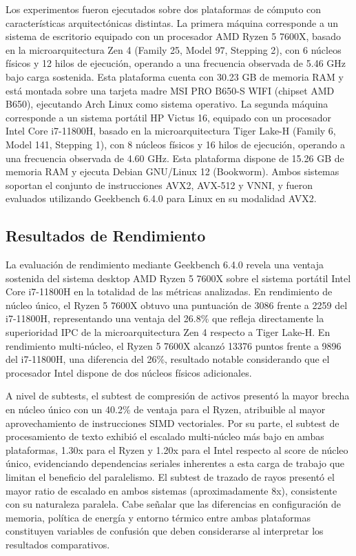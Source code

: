 Los experimentos fueron ejecutados sobre dos plataformas de cómputo con características arquitectónicas distintas. La primera máquina corresponde a un sistema de escritorio equipado con un procesador AMD Ryzen 5 7600X, basado en la microarquitectura Zen 4 (Family 25, Model 97, Stepping 2), con 6 núcleos físicos y 12 hilos de ejecución, operando a una frecuencia observada de 5.46 GHz bajo carga sostenida. Esta plataforma cuenta con 30.23 GB de memoria RAM y está montada sobre una tarjeta madre MSI PRO B650-S WIFI (chipset AMD B650), ejecutando Arch Linux como sistema operativo. La segunda máquina corresponde a un sistema portátil HP Victus 16, equipado con un procesador Intel Core i7-11800H, basado en la microarquitectura Tiger Lake-H (Family 6, Model 141, Stepping 1), con 8 núcleos físicos y 16 hilos de ejecución, operando a una frecuencia observada de 4.60 GHz. Esta plataforma dispone de 15.26 GB de memoria RAM y ejecuta Debian GNU/Linux 12 (Bookworm). Ambos sistemas soportan el conjunto de instrucciones AVX2, AVX-512 y VNNI, y fueron evaluados utilizando Geekbench 6.4.0 para Linux en su modalidad AVX2.

\subsection{Resultados de Rendimiento}

La evaluación de rendimiento mediante Geekbench 6.4.0 revela una ventaja sostenida del sistema desktop AMD Ryzen 5 7600X sobre el sistema portátil Intel Core i7-11800H en la totalidad de las métricas analizadas. En rendimiento de núcleo único, el Ryzen 5 7600X obtuvo una puntuación de 3086 frente a 2259 del i7-11800H, representando una ventaja del 26.8\% que refleja directamente la superioridad IPC de la microarquitectura Zen 4 respecto a Tiger Lake-H. En rendimiento multi-núcleo, el Ryzen 5 7600X alcanzó 13376 puntos frente a 9896 del i7-11800H, una diferencia del 26\%, resultado notable considerando que el procesador Intel dispone de dos núcleos físicos adicionales.

A nivel de subtests, el subtest de compresión de activos presentó la mayor brecha en núcleo único con un 40.2\% de ventaja para el Ryzen, atribuible al mayor aprovechamiento de instrucciones SIMD vectoriales. Por su parte, el subtest de procesamiento de texto exhibió el escalado multi-núcleo más bajo en ambas plataformas, 1.30x para el Ryzen y 1.20x para el Intel respecto al score de núcleo único, evidenciando dependencias seriales inherentes a esta carga de trabajo que limitan el beneficio del paralelismo. El subtest de trazado de rayos presentó el mayor ratio de escalado en ambos sistemas (aproximadamente 8x), consistente con su naturaleza paralela. Cabe señalar que las diferencias en configuración de memoria, política de energía y entorno térmico entre ambas plataformas constituyen variables de confusión que deben considerarse al interpretar los resultados comparativos.